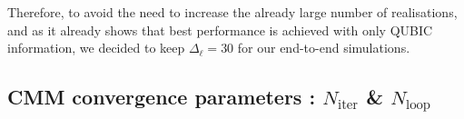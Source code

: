\documentclass[../../thesis.tex]{subfiles}
\begin{document}
Therefore, to avoid the need to increase the already large number of realisations, and as it already shows that best performance is achieved with only QUBIC information, we decided to keep $\Delta_\ell = 30$ for our end-to-end simulations. 


\subsection{CMM convergence parameters : $N_\text{iter}$ \& $N_\text{loop}$}
\end{document}
